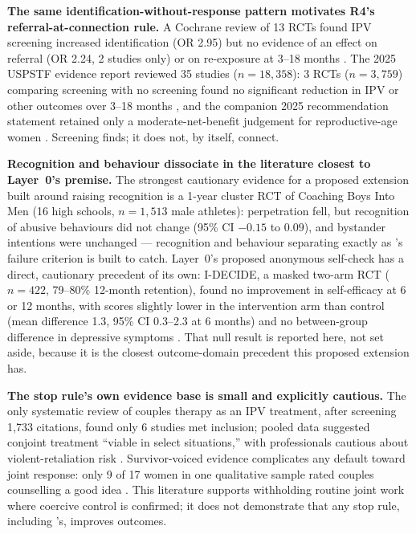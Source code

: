 \textbf{The same identification-without-response pattern motivates R4's referral-at-connection
rule.} A Cochrane review of 13 RCTs found IPV screening increased identification (OR 2.95) but no
evidence of an effect on referral (OR 2.24, 2 studies only) or on re-exposure at 3--18 months
\cite{ref38}. The 2025 USPSTF evidence report reviewed 35 studies ($n=18{,}358$): 3 RCTs
($n=3{,}759$) comparing screening with no screening found no significant reduction in IPV or other
outcomes over 3--18 months \cite{ref39}, and the companion 2025 recommendation statement retained
only a moderate-net-benefit judgement for reproductive-age women \cite{ref40}. Screening finds; it
does not, by itself, connect.

\textbf{Recognition and behaviour dissociate in the literature closest to Layer~0's premise.} The
strongest cautionary evidence for a proposed extension built around raising recognition is a 1-year
cluster RCT of Coaching Boys Into Men (16 high schools, $n=1{,}513$ male athletes): perpetration
fell, but recognition of abusive behaviours did not change (95\% CI $-0.15$ to $0.09$), and
bystander intentions were unchanged \cite{ref190} --- recognition and behaviour separating exactly
as \tphe{}'s failure criterion is built to catch. Layer~0's proposed anonymous self-check has a
direct, cautionary precedent of its own: I-DECIDE, a masked two-arm RCT ($n=422$, 79--80\% 12-month
retention), found no improvement in self-efficacy at 6 or 12 months, with scores slightly lower in
the intervention arm than control (mean difference 1.3, 95\% CI 0.3--2.3 at 6 months) and no
between-group difference in depressive symptoms \cite{ref119,ref120}. That null result
is reported here, not set aside, because it is the closest outcome-domain precedent this proposed
extension has.

\textbf{The stop rule's own evidence base is small and explicitly cautious.} The only systematic
review of couples therapy as an IPV treatment, after screening 1{,}733 citations, found only 6
studies met inclusion; pooled data suggested conjoint treatment ``viable in select situations,''
with professionals cautious about violent-retaliation risk \cite{ref45}. Survivor-voiced evidence
complicates any default toward joint response: only 9 of 17 women in one qualitative sample rated
couples counselling a good idea \cite{ref48}. This literature supports withholding routine joint
work where coercive control is confirmed; it does not demonstrate that any stop rule, including
\tphe{}'s, improves outcomes.

